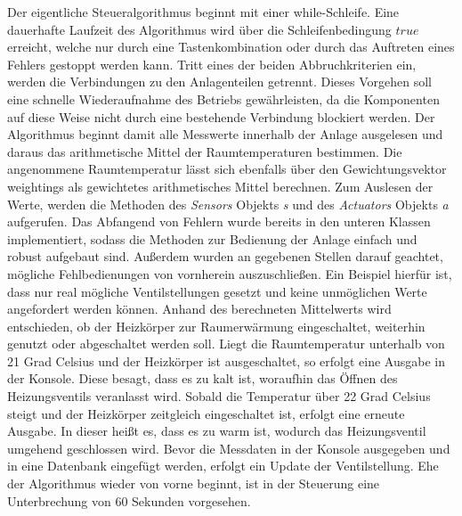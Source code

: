 Der eigentliche Steueralgorithmus beginnt mit einer while-Schleife. Eine dauerhafte Laufzeit des Algorithmus wird über die Schleifenbedingung $true$ erreicht, welche nur durch eine Tastenkombination oder durch das Auftreten eines Fehlers gestoppt werden kann.
 Tritt eines der beiden Abbruchkriterien ein, werden die Verbindungen zu den Anlagenteilen getrennt. Dieses Vorgehen soll eine schnelle Wiederaufnahme des Betriebs gewährleisten, da die Komponenten auf diese Weise nicht durch eine bestehende Verbindung blockiert werden.
Der Algorithmus beginnt damit alle Messwerte innerhalb der Anlage ausgelesen und daraus das arithmetische Mittel der Raumtemperaturen bestimmen. Die angenommene Raumtemperatur lässt sich ebenfalls über den Gewichtungsvektor weightings als gewichtetes arithmetisches Mittel berechnen.
Zum Auslesen der Werte, werden die Methoden des \textit{Sensors} Objekts \textit{s} und des \textit{Actuators} Objekts \textit{a} aufgerufen.
Das Abfangend von Fehlern wurde bereits in den unteren Klassen implementiert, sodass die Methoden zur Bedienung der Anlage einfach und robust aufgebaut sind. Außerdem wurden an gegebenen Stellen darauf geachtet, mögliche Fehlbedienungen  von vornherein auszuschließen. Ein Beispiel hierfür ist, dass nur real mögliche Ventilstellungen gesetzt und keine unmöglichen Werte angefordert werden können.
Anhand des berechneten Mittelwerts wird entschieden, ob der Heizkörper zur Raumerwärmung eingeschaltet, weiterhin genutzt oder abgeschaltet werden soll. Liegt die Raumtemperatur unterhalb von 21 Grad Celsius und der Heizkörper ist ausgeschaltet, so erfolgt eine Ausgabe in der Konsole. Diese besagt, dass es zu kalt ist, woraufhin das Öffnen des Heizungsventils veranlasst wird. Sobald die Temperatur über 22 Grad Celsius steigt und der Heizkörper zeitgleich eingeschaltet ist, erfolgt eine erneute Ausgabe. In dieser heißt es, dass es zu warm ist, wodurch das Heizungsventil umgehend geschlossen wird.
Bevor die Messdaten in der Konsole ausgegeben und in eine Datenbank eingefügt werden, erfolgt ein Update der Ventilstellung. Ehe der Algorithmus wieder von vorne beginnt, ist in der Steuerung eine Unterbrechung von 60 Sekunden vorgesehen.




